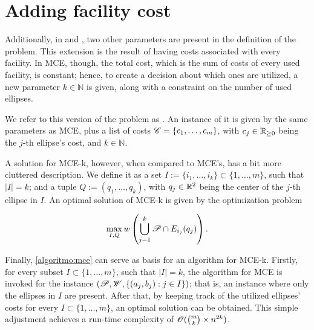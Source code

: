 \section{Adding facility cost}

Additionally, in  and , two other parameters are present in the definition of the problem. This extension is the result of having costs associated with every facility.
In MCE, though, the total cost, which is the sum of costs of every used facility, is constant; hence, to create a decision about which ones are utilized, a new parameter $k\in\mathbb{N}$ is given, along with a constraint on the number of used ellipses.

We refer to this version of the problem as  . An instance of it is given by the same parameters as MCE, plus a list of costs $\mathscr{C}=\{c_1, \dots, c_m\}$, with $c_j\in\mathbb{R}_{\ge0}$ being the $j$-th ellipse's cost, and $k\in\mathbb{N}$.

 A solution for MCE-k, however,  when compared to MCE's, has a bit more cluttered description. We define it as a set $I:=\{i_1, \dots, i_k\}\subset\{1, \dots, m\}$, such that $|I|=k$; and a tuple $Q:=(q_1, \dots, q_k)$, with $q_j\in\mathbb{R}^2$ being the center of the $j$-th ellipse in $I$. An optimal solution of MCE-k is given by the optimization problem

\begin{equation}
\max_{I, Q} w\left(\bigcup_{j=1}^k \mathscr{P} \cap E_{i_j}(q_j)\right).
\end{equation}

Finally, \autoref{algoritmo:mce} can serve as basis for an algorithm for MCE-k. 
Firstly, for every subset $I \subset \{1, \dots, m\}$, such that $|I| = k$, the algorithm for MCE is invoked for the instance $(\mathscr{P}, \mathscr{W}, \{(a_j, b_j) : j \in I\})$; that is, an instance where only the ellipses in $I$ are present.
After that, by keeping track of the utilized ellipses' costs for every $I \subset \{1, \dots, m\}$, an optimal solution can be obtained.
This simple adjustment achieves a run-time complexity of $\mathscr{O}(\binom{m}{k} \times n^{2k})$. 

